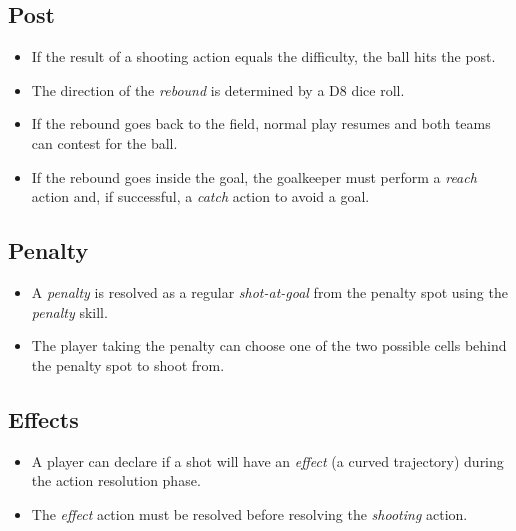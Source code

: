 \documentclass[12pt]{article}
\begin{document}
\subsection{Post}

\begin{rulebox}
\begin{itemize}
\item If the result of a shooting action equals the difficulty, the ball hits the post.
\item The direction of the \emph{rebound }is determined by a D8 dice roll.
\item If the rebound goes back to the field, normal play resumes and both teams can contest for the ball.
\item If the rebound goes inside the goal, the goalkeeper must perform a \emph{reach} action and, if successful, a \emph{catch} action to avoid a goal.
\end{itemize}
\end{rulebox}

\subsection{\textbf{Penalty}}

\begin{rulebox}
\begin{itemize}
\item A \emph{penalty }is resolved as a regular\emph{ shot-at-goal }from the penalty spot using the \emph{penalty }skill.
\item The player taking the penalty can choose one of the two possible cells behind the penalty spot to shoot from.
\end{itemize}
\end{rulebox}

\subsection{\textbf{Effects}}

\begin{rulebox}
\begin{itemize}
\item A player can declare if a shot will have an \emph{effect} (a curved trajectory) during the action resolution phase.
\item The \emph{effect }action must be resolved before resolving the \emph{shooting }action.
\end{itemize}
\end{rulebox}
\end{document}
